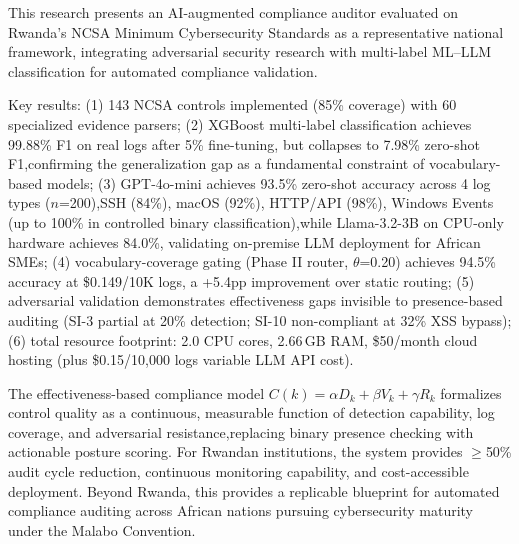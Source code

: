 \documentclass[futureinternet,article,submit,pdftex,moreauthors]{Definitions/mdpi}
\begin{document}
This research presents an AI-augmented compliance auditor evaluated on Rwanda's NCSA Minimum
Cybersecurity Standards as a representative national framework, integrating adversarial
security research with multi-label ML--LLM classification for automated compliance validation.

Key results: (1) 143 NCSA controls implemented (85\% coverage) with 60 specialized evidence
parsers; (2) XGBoost multi-label classification achieves 99.88\% F1 on real logs after 5\%
fine-tuning, but collapses to 7.98\% zero-shot F1,confirming the generalization gap as a
fundamental constraint of vocabulary-based models; (3) GPT-4o-mini achieves 93.5\% zero-shot
accuracy across 4 log types ($n$=200),SSH (84\%), macOS (92\%), HTTP/API (98\%), Windows
Events (up to 100\% in controlled binary classification),while Llama-3.2-3B on CPU-only hardware achieves 84.0\%, validating
on-premise LLM deployment for African SMEs; (4) vocabulary-coverage gating (Phase II router,
$\theta$=0.20) achieves 94.5\% accuracy at \$0.149/10K logs, a +5.4pp improvement over static
routing; (5) adversarial validation demonstrates effectiveness gaps invisible to presence-based
auditing (SI-3 partial at 20\% detection; SI-10 non-compliant at 32\% XSS bypass);
(6) total resource footprint: 2.0 CPU cores, 2.66\,GB RAM, \$50/month cloud hosting
(plus \$0.15/10{,}000 logs variable LLM API cost).

The effectiveness-based compliance model $C(k) = \alpha D_k + \beta V_k + \gamma R_k$
formalizes control quality as a continuous, measurable function of detection capability, log
coverage, and adversarial resistance,replacing binary presence checking with actionable
posture scoring. For Rwandan institutions, the system provides $\geq$50\% audit cycle
reduction, continuous monitoring capability, and cost-accessible deployment. Beyond Rwanda,
this provides a replicable blueprint for automated compliance auditing across African nations
pursuing cybersecurity maturity under the Malabo Convention.

\vspace{6pt}

\end{document}
